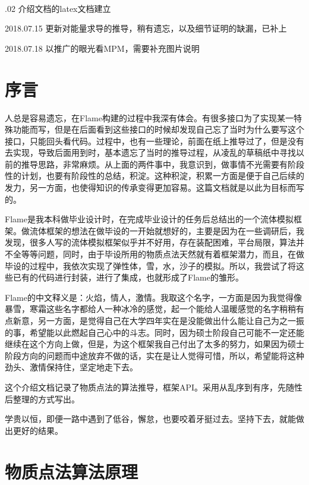 \documentclass[UTF8]{article}
\begin{document}
\tableofcontents
\newpage
{\songti {}\\}%
{.02 介绍文档的latex文档建立

2018.07.15 更新对能量求导的推导，稍有遗忘，以及细节证明的缺漏，已补上

2018.07.18 以推广的眼光看MPM，需要补充图片说明
}

\newpage
\section{{序言}}

{\songti
人总是容易遗忘，在Flame构建的过程中我深有体会。有很多接口为了实现某一特殊功能而写，但是在后面看到这些接口的时候却发现自己忘了当时为什么要写这个接口，只能回头看代码。过程中，也有一些理论，前面在纸上推导过了，但是没有去实现，导致后面用到时，基本遗忘了当时的推导过程，从凌乱的草稿纸中寻找以前的推导思路，非常麻烦。从上面的两件事中，我意识到，做事情不光需要有阶段性的计划，也要有阶段性的总结，积淀。这种积淀，积累一方面是便于自己后续的发力，另一方面，也使得知识的传承变得更加容易。这篇文档就是以此为目标而写的。

Flame是我本科做毕业设计时，在完成毕业设计的任务后总结出的一个流体模拟框架。做流体框架的想法在做毕设的一开始就想好的，主要是因为在一些调研后，我发现，很多人写的流体模拟框架似乎并不好用，存在装配困难，平台局限，算法并不全等等问题，同时，由于毕设所用的物质点法天然就有着框架潜力，而且，在做毕设的过程中，我依次实现了弹性体，雪，水，沙子的模拟。所以，我尝试了将这些已有的代码进行封装，进行了集成，也就形成了Flame的雏形。

Flame的中文释义是：火焰，情人，激情。我取这个名字，一方面是因为我觉得像暴雪，寒霜这些名字都给人一种冰冷的感觉，起一个能给人温暖感觉的名字稍稍有点新意，另一方面，是觉得自己在大学四年实在是没能做出什么能让自己为之一振的事，希望能以此燃起自己心中的斗志。同时，因为硕士阶段自己可能不一定还能继续在这个方向上做，但是，为这个框架我自己付出了太多的努力，如果因为硕士阶段方向的问题而中途放弃不做的话，实在是让人觉得可惜，所以，希望能将这种劲头、激情保持住，坚定地走下去。

这个介绍文档记录了物质点法的算法推导，框架API。采用从乱序到有序，先随性后整理的方式写出。

学贵以恒，即便一路中遇到了低谷，懈怠，也要咬着牙挺过去。坚持下去，就能做出更好的结果。
}


\newpage
\section{{物质点法算法原理}}
\end{document}
